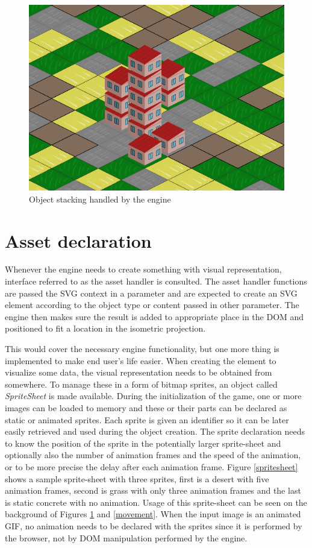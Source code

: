 \documentclass[11pt,oneside, final]{fithesis2}
\begin{document}
\begin{figure}[h]
	\centering
	\includegraphics[width=\textwidth]{thesis-stacking}
	\caption{Object stacking handled by the engine}
	\label{stacking}
\end{figure}

\section{Asset declaration}
Whenever the engine needs to create something with visual representation, interface referred to as the asset handler is consulted. The asset handler functions are passed the SVG context in a parameter and are expected to create an SVG element according to the object type or content passed in other parameter. The engine then makes sure the result is added to appropriate place in the DOM and positioned to fit a location in the isometric projection.

This would cover the necessary engine functionality, but one more thing is implemented to make end user's life easier. When creating the element to visualize some data, the visual representation needs to be obtained from somewhere. To manage these in a form of bitmap sprites, an object called \emph{SpriteSheet} is made available. During the initialization of the game, one or more images can be loaded to memory and these or their parts can be declared as static or animated sprites. Each sprite is given an identifier so it can be later easily retrieved and used during the object creation. The sprite declaration needs to know the position of the sprite in the potentially larger sprite-sheet and optionally also the number of animation frames and the speed of the animation, or to be more precise the delay after each animation frame. Figure \ref{spritesheet} shows a sample sprite-sheet with three sprites, first is a desert with five animation frames, second is grass with only three animation frames and the last is static concrete with no animation. Usage of this sprite-sheet can be seen on the background of Figures \ref{stacking} and \ref{movement}. When the input image is an animated GIF, no animation needs to be declared with the sprites since it is performed by the browser, not by DOM manipulation performed by the engine.
\end{document}
